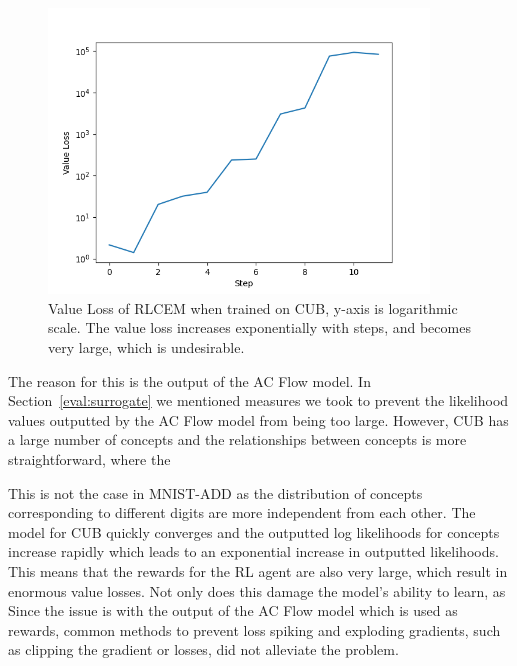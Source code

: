 \begin{figure}[!h]
    \centering
    \includegraphics[width=0.9\textwidth]{figs/evaluation/cub_v_loss_spike.png}
    \caption{
        Value Loss of RLCEM when trained on CUB,
        y-axis is logarithmic scale.
        The value loss increases exponentially with steps, 
        and becomes very large, which is undesirable.
    }
    \label{fig:cub-v-loss-spike}
\end{figure}

The reason for this is the output of the AC Flow model.
In Section~\ref{eval:surrogate} we mentioned measures we took to prevent
the likelihood values outputted by the AC Flow model from being too large.
However, CUB has a large number of concepts and 
the relationships between concepts is more straightforward,
where the 


This is not the case in MNIST-ADD as the distribution of concepts corresponding to 
different 
digits are more independent from each other.
The model for CUB quickly converges and the outputted log likelihoods 
for concepts increase rapidly which leads to an exponential increase 
in outputted likelihoods. This means that the rewards for the RL agent
are also very large, which result in enormous value losses.
Not only does this damage the model's ability to learn,
as
Since the issue is with the output of the AC Flow model
which is used as rewards, common methods to prevent loss spiking
and exploding gradients,
such as clipping the gradient or losses, did not alleviate the problem.


